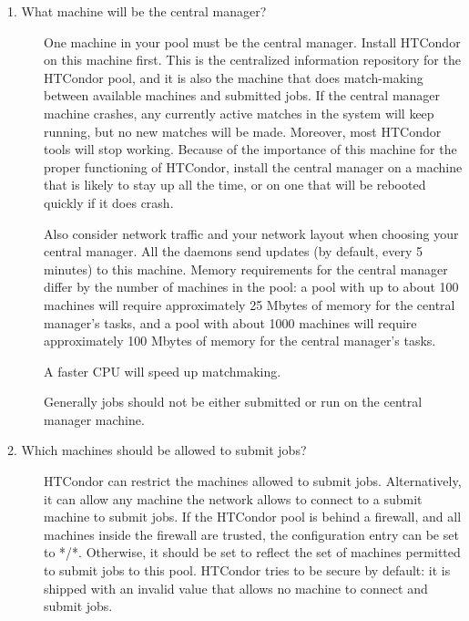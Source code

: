 \begin{description}

\item[1. What machine will be the central manager?]

One machine in your pool must be the central manager.
Install HTCondor on this machine first.
This is the centralized information repository for the HTCondor pool,
and it is also the
machine that does match-making between available machines and
submitted jobs.
If the central manager machine crashes, any currently active
matches in the system will keep running, but no new matches will be
made.  Moreover, most HTCondor tools will stop working.  Because of the
importance of this machine for the proper functioning of HTCondor,
install the central manager on a machine that is likely to stay up all the
time, or on one that will be rebooted quickly if it does crash.

Also consider
network traffic and your network layout when choosing your central
manager.
All the daemons send updates (by default, every 5 minutes) to this machine.
Memory requirements for the central manager differ by the number of machines
in the pool:
a pool with up to about 100 machines will require approximately
25 Mbytes of memory for the central manager's tasks,
and a pool with about 1000 machines will require approximately
100 Mbytes of memory for the central manager's tasks.

A faster CPU will speed up matchmaking. 

Generally jobs should not be either submitted or run on the central
manager machine.

\item[2. Which machines should be allowed to submit jobs?]

HTCondor can restrict the machines allowed to submit jobs.  Alternatively, 
it can allow any machine the network allows to connect to a submit machine
to submit jobs.  If the HTCondor pool is behind a firewall, and all machines
inside the firewall are trusted, the  configuration
entry can be set to */*.  Otherwise, it should be set to reflect
the set of machines permitted to submit jobs to this pool.
HTCondor tries to be secure by default: it is shipped with an invalid value
that allows no machine to connect and submit jobs.


\end{description}

